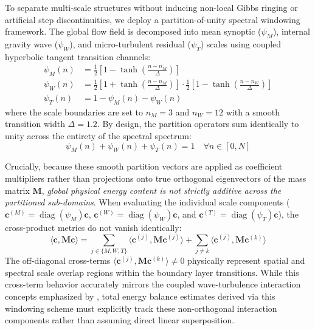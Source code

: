 To separate multi-scale structures without inducing non-local Gibbs ringing or artificial step discontinuities, we deploy a partition-of-unity spectral windowing framework. The global flow field is decomposed into mean synoptic ($\psi_M$), internal gravity wave ($\psi_W$), and micro-turbulent residual ($\psi_T$) scales using coupled hyperbolic tangent transition channels:
\begin{align}
  \psi_M(n) &= \frac{1}{2}\left[1 - \tanh\left(\frac{n - n_M}{\Delta}\right)\right] \label{eq:psi_m_def} \\
  \psi_W(n) &= \frac{1}{2}\left[1 + \tanh\left(\frac{n - n_M}{\Delta}\right)\right] \cdot \frac{1}{2}\left[1 - \tanh\left(\frac{n - n_W}{\Delta}\right)\right] \label{eq:psi_w_def} \\
  \psi_T(n) &= 1 - \psi_M(n) - \psi_W(n) \label{eq:psi_t_def}
\end{align}
where the scale boundaries are set to $n_M = 3$ and $n_W = 12$ with a smooth transition width $\Delta = 1.2$. By design, the partition operators sum identically to unity across the entirety of the spectral spectrum:
\begin{equation}
\psi_M(n) + \psi_W(n) + \psi_T(n) = 1 \quad \forall n \in [0, N]
\label{eq:partition_unity}
\end{equation}

Crucially, because these smooth partition vectors are applied as coefficient multipliers rather than projections onto true orthogonal eigenvectors of the mass matrix $\mathbf{M}$, \emph{global physical energy content is not strictly additive across the partitioned sub-domains}. When evaluating the individual scale components ($\mathbf{c}^{(M)} = \operatorname{diag}(\psi_M)\mathbf{c}$, $\mathbf{c}^{(W)} = \operatorname{diag}(\psi_W)\mathbf{c}$, and $\mathbf{c}^{(T)} = \operatorname{diag}(\psi_T)\mathbf{c}$), the cross-product metrics do not vanish identically:
\begin{equation}
\langle \mathbf{c}, \mathbf{M} \mathbf{c} \rangle = \sum_{j \in \{M,W,T\}} \langle \mathbf{c}^{(j)}, \mathbf{M} \mathbf{c}^{(j)} \rangle + \sum_{j \neq k} \langle \mathbf{c}^{(j)}, \mathbf{M} \mathbf{c}^{(k)} \rangle
\label{eq:energy_overlap}
\end{equation}
The off-diagonal cross-terms $\langle \mathbf{c}^{(j)}, \mathbf{M} \mathbf{c}^{(k)} \rangle \neq 0$ physically represent spatial and spectral scale overlap regions within the boundary layer transitions. While this cross-term behavior accurately mirrors the coupled wave-turbulence interaction concepts emphasized by \citet{Sun2015}, total energy balance estimates derived via this windowing scheme must explicitly track these non-orthogonal interaction components rather than assuming direct linear superposition.

